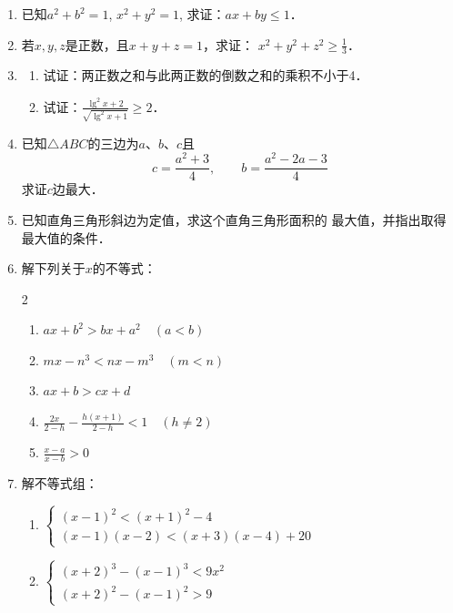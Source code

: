 \begin{enumerate}
\item 已知$a^2+b^2=1$, $x^2+y^2=1$, 求证：$ax+by\le 1$．
\item 若$x,y,z$是正数，且$x+y+z=1$，求证：
$x^2+y^2+z^2\ge \frac{1}{3}$．
\item \begin{enumerate}
    \item 试证：两正数之和与此两正数的倒数之和的乘积不小于4．
    \item 试证：$\frac{\lg^2x+2}{\sqrt{\lg^2x+1}}\ge 2$．
\end{enumerate}
\item 已知$\triangle ABC$的三边为$a$、$b$、$c$且
\[c=\frac{a^2+3}{4},\qquad b=\frac{a^2-2a-3}{4}\]
求证$c$边最大．
\item 
已知直角三角形斜边为定值，求这个直角三角形面积的
最大值，并指出取得最大值的条件．
\item 
解下列关于$x$的不等式：
\begin{multicols}{2}
\begin{enumerate}
    \item $ax+b^2>bx+a^2\quad (a<b)$
    \item $mx-n^3<nx-m^3\quad (m<n)$
    \item $ax+b>cx+d$
    \item $\frac{2x}{2-h}-\frac{h(x+1)}{2-h}<1\quad (h\ne 2)$
    \item $\frac{x-a}{x-b}>0$
\end{enumerate}
\end{multicols}
\item 解不等式组：
\begin{enumerate}
    \item $\begin{cases}
        (x-1)^2<(x+1)^2-4\\(x-1)(x-2)<(x+3)(x-4)+20
    \end{cases}$
    \item $\begin{cases}
        (x+2)^3-(x-1)^3<9x^2 \\(x+2)^2-(x-1)^2>9
    \end{cases}$
\end{enumerate}


\end{enumerate}
